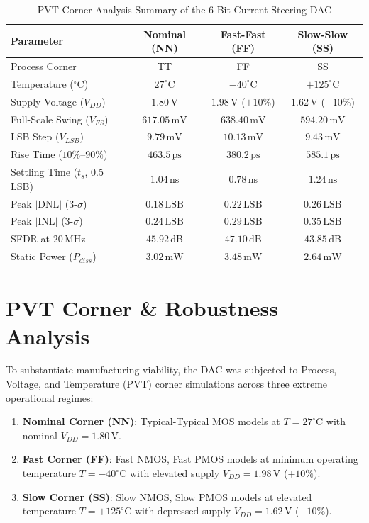 \documentclass[conference,10pt]{IEEEtran}
\begin{document}
\begin{table}[t]
\centering
\caption{PVT Corner Analysis Summary of the 6-Bit Current-Steering DAC}
\label{tab:pvt_table}
\begin{tabular}{lccc}
\toprule
\textbf{Parameter} & \textbf{Nominal (NN)} & \textbf{Fast-Fast (FF)} & \textbf{Slow-Slow (SS)} \\
\midrule
Process Corner & TT & FF & SS \\
Temperature ($^\circ\text{C}$) & $27^\circ\text{C}$ & $-40^\circ\text{C}$ & $+125^\circ\text{C}$ \\
Supply Voltage ($V_{DD}$) & $1.80\,\text{V}$ & $1.98\,\text{V}$ ($+10\%$) & $1.62\,\text{V}$ ($-10\%$) \\
\midrule
Full-Scale Swing ($V_{FS}$) & $617.05\,\text{mV}$ & $638.40\,\text{mV}$ & $594.20\,\text{mV}$ \\
LSB Step ($V_{LSB}$) & $9.79\,\text{mV}$ & $10.13\,\text{mV}$ & $9.43\,\text{mV}$ \\
Rise Time ($10\%$--$90\%$) & $463.5\,\text{ps}$ & $380.2\,\text{ps}$ & $585.1\,\text{ps}$ \\
Settling Time ($t_s$, 0.5 LSB) & $1.04\,\text{ns}$ & $0.78\,\text{ns}$ & $1.24\,\text{ns}$ \\
Peak $|\text{DNL}|$ (3-$\sigma$) & $0.18\,\text{LSB}$ & $0.22\,\text{LSB}$ & $0.26\,\text{LSB}$ \\
Peak $|\text{INL}|$ (3-$\sigma$) & $0.24\,\text{LSB}$ & $0.29\,\text{LSB}$ & $0.35\,\text{LSB}$ \\
SFDR at $20\,\text{MHz}$ & $45.92\,\text{dB}$ & $47.10\,\text{dB}$ & $43.85\,\text{dB}$ \\
Static Power ($P_{diss}$) & $3.02\,\text{mW}$ & $3.48\,\text{mW}$ & $2.64\,\text{mW}$ \\
\bottomrule
\end{tabular}
\end{table}

\section{PVT Corner \& Robustness Analysis}
To substantiate manufacturing viability, the DAC was subjected to Process, Voltage, and Temperature (PVT) corner simulations across three extreme operational regimes:
\begin{enumerate}
    \item \textbf{Nominal Corner (NN)}: Typical-Typical MOS models at $T = 27^\circ\text{C}$ with nominal $V_{DD} = 1.80\,\text{V}$.
    \item \textbf{Fast Corner (FF)}: Fast NMOS, Fast PMOS models at minimum operating temperature $T = -40^\circ\text{C}$ with elevated supply $V_{DD} = 1.98\,\text{V}$ ($+10\%$).
    \item \textbf{Slow Corner (SS)}: Slow NMOS, Slow PMOS models at elevated temperature $T = +125^\circ\text{C}$ with depressed supply $V_{DD} = 1.62\,\text{V}$ ($-10\%$).
\end{enumerate}
\end{document}
